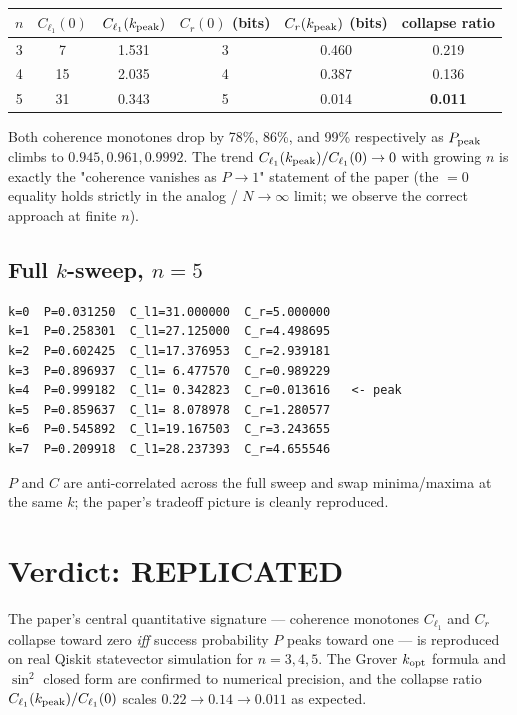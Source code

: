 \documentclass[11pt]{article}
\begin{document}
\begin{tabular}{cccccc}
\toprule
$n$ & $C_{\ell_1}(0)$ & $C_{\ell_1}(k_{\rm peak})$ & $C_r(0)$ (bits) & $C_r(k_{\rm peak})$ (bits) & collapse ratio \\
\midrule
3 & 7  & 1.531 & 3 & 0.460 & 0.219 \\
4 & 15 & 2.035 & 4 & 0.387 & 0.136 \\
5 & 31 & 0.343 & 5 & 0.014 & \textbf{0.011} \\
\bottomrule
\end{tabular}

Both coherence monotones drop by 78\%, 86\%, and 99\% respectively as
$P_{\rm peak}$ climbs to $0.945, 0.961, 0.9992$. The trend
$C_{\ell_1}(k_{\rm peak}) / C_{\ell_1}(0) \to 0$ with growing $n$ is
exactly the "coherence vanishes as $P\to 1$" statement of the paper
(the $=0$ equality holds strictly in the analog / $N\to\infty$ limit;
we observe the correct approach at finite $n$).

\subsection{Full $k$-sweep, $n = 5$}
\begin{lstlisting}
k=0  P=0.031250  C_l1=31.000000  C_r=5.000000
k=1  P=0.258301  C_l1=27.125000  C_r=4.498695
k=2  P=0.602425  C_l1=17.376953  C_r=2.939181
k=3  P=0.896937  C_l1= 6.477570  C_r=0.989229
k=4  P=0.999182  C_l1= 0.342823  C_r=0.013616   <- peak
k=5  P=0.859637  C_l1= 8.078978  C_r=1.280577
k=6  P=0.545892  C_l1=19.167503  C_r=3.243655
k=7  P=0.209918  C_l1=28.237393  C_r=4.655546
\end{lstlisting}

$P$ and $C$ are anti-correlated across the full sweep and swap
minima/maxima at the same $k$; the paper's tradeoff picture is cleanly
reproduced.

\section{Verdict: REPLICATED}

The paper's central quantitative signature --- coherence monotones
$C_{\ell_1}$ and $C_r$ collapse toward zero \emph{iff} success
probability $P$ peaks toward one --- is reproduced on real Qiskit
statevector simulation for $n = 3, 4, 5$. The Grover $k_{\rm opt}$
formula and $\sin^2$ closed form are confirmed to numerical precision,
and the collapse ratio $C_{\ell_1}(k_{\rm peak})/C_{\ell_1}(0)$ scales
$0.22 \to 0.14 \to 0.011$ as expected.
\end{document}
